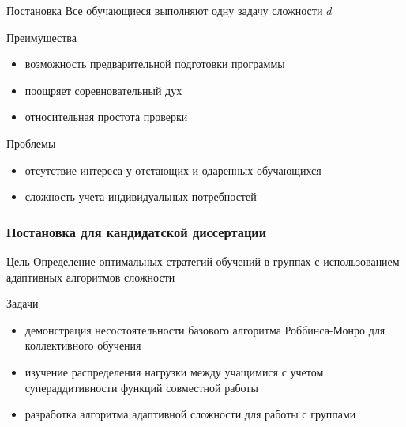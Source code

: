 \begin{frame}
    \begin{block}{Постановка}
        Все обучающиеся выполняют одну задачу сложности $d$
    \end{block}
    \begin{exampleblock}{Преимущества}
        \begin{itemize}
            \item возможность предварительной подготовки программы
            \item поощряет соревновательный дух
            \item относительная простота проверки
        \end{itemize}
    \end{exampleblock}
    \begin{alertblock}{Проблемы}
        \begin{itemize}
            \item отсутствие интереса у отстающих и одаренных обучающихся
            \item сложность учета индивидуальных потребностей
        \end{itemize}
    \end{alertblock}
\end{frame}


\begin{frame}
    \frametitle{Постановка для кандидатской диссертации}
    \centering
    \begin{block}{Цель}
        Определение оптимальных стратегий обучений в группах с использованием адаптивных алгоритмов сложности
    \end{block}

    \begin{block}{Задачи}
        \begin{itemize}
            \item демонстрация несостоятельности базового алгоритма Роббинса-Монро для коллективного обучения
            \item изучение распределения нагрузки между учащимися с учетом супераддитивности функций совместной работы
            \item разработка алгоритма адаптивной сложности для работы с группами
        \end{itemize}
    \end{block}

\end{frame}

